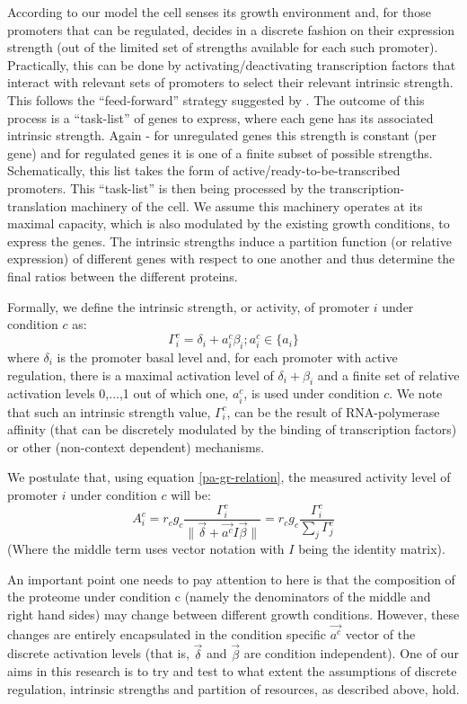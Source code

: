 \documentclass[a4page,notitlepage]{article}
\providecommand{\norm}[1]{\lVert#1\rVert}
\begin{document}
According to our model the cell senses its growth environment and, for those promoters that can be regulated, decides in a discrete fashion on their expression strength (out of the limited set of strengths available for each such promoter).
Practically, this can be done by activating/deactivating transcription factors that interact with relevant sets of promoters to select their relevant intrinsic strength.
This follows the ``feed-forward'' strategy suggested by \parencite{Levy2009}.
The outcome of this process is a ``task-list'' of genes to express, where each gene has its associated intrinsic strength.
Again - for unregulated genes this strength is constant (per gene) and for regulated genes it is one of a finite subset of possible strengths.
Schematically, this list takes the form of active/ready-to-be-transcribed promoters.
This ``task-list'' is then being processed by the transcription-translation machinery of the cell.
We assume this machinery operates at its maximal capacity, which is also modulated by the existing growth conditions, to express the genes.
The intrinsic strengths induce a partition function (or relative expression) of different genes with respect to one another and thus determine the final ratios between the different proteins.

Formally, we define the intrinsic strength, or activity, of promoter $i$ under condition $c$ as:
\[\Gamma^c_i=\delta_i+a^c_i\beta_i ; a^c_i\in \{a_i\}\]
where $\delta_i$ is the promoter basal level and, for each promoter with active regulation, there is a maximal activation level of $\delta_i+\beta_i$ and a finite set of relative activation levels {0,...,1} out of which one, $a^c_i$, is used under condition $c$.
We note that such an intrinsic strength value, $\Gamma^c_i$, can be the result of RNA-polymerase affinity (that can be discretely modulated by the binding of transcription factors) or other (non-context dependent) mechanisms.

We postulate that, using equation \ref{pa-gr-relation}, the measured activity level of promoter $i$ under condition $c$ will be:
\begin{equation}
\label{cond-act}
A^c_i=r_cg_c\frac{\Gamma^c_i}{\norm{\vec{\delta}+\vec{a^c}I\vec{\beta}}}=r_cg_c\frac{\Gamma^c_i}{\sum_{j}\Gamma^c_j}
\end{equation}
(Where the middle term uses vector notation with $I$ being the identity matrix).

An important point one needs to pay attention to here is that the composition of the proteome under condition c (namely the denominators of the middle and right hand sides) may change between different growth conditions.
However, these changes are entirely encapsulated in the condition specific $\vec{a^c}$ vector of the discrete activation levels (that is, $\vec{\delta}$ and $\vec{\beta}$ are condition independent).
One of our aims in this research is to try and test to what extent the assumptions of discrete regulation, intrinsic strengths and partition of resources, as described above, hold.
\end{document}
